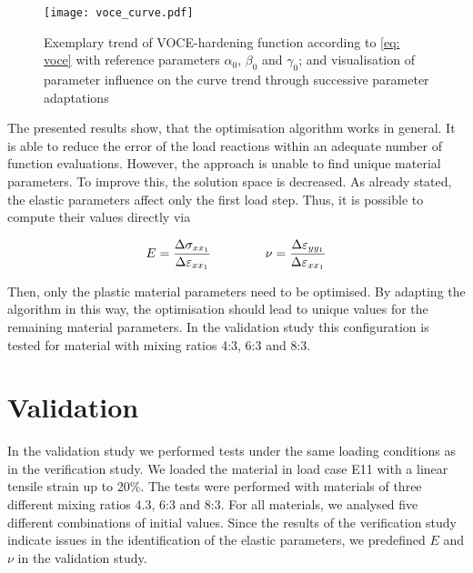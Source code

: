 \begin{figure}[H]
    \centering
    \texttt{[image: voce\_curve.pdf]}
    \caption{Exemplary trend of VOCE-hardening function according to \autoref{eq: voce} with reference parameters $\alpha_0$, $\beta_0$ and $\gamma_0$; and visualisation of parameter influence on the curve trend through successive parameter adaptations}
    \label{fig:voceCurve}
\end{figure}

The presented results show, that the optimisation algorithm works in general. It is able to reduce the error of the load reactions within an adequate number of function evaluations. However, the approach is unable to find unique material parameters. To improve this, the solution space is decreased. As already stated, the elastic parameters affect only the first load step. Thus, it is possible to compute their values directly via

\begin{gather}\label{eq: EandNu}
    E = \frac{\Delta\sigma_{xx_1}}{\Delta\varepsilon_{xx_1}} \hspace{1.5cm}
    \nu = \frac{\Delta\varepsilon_{yy_1}}{\Delta\varepsilon_{xx_1}}
\end{gather}
    
Then, only the plastic material parameters need to be optimised. By adapting the algorithm in this way, the optimisation should lead to unique values for the remaining material parameters. In the validation study this configuration is tested for material with mixing ratios 4:3, 6:3 and 8:3. \\


\newpage
\section{Validation}\label{sec: validation}
In the validation study we performed tests under the same loading conditions as in the verification study.
We loaded the material in load case E11 with a linear tensile strain up to 20\%.
The tests were performed with materials of three different mixing ratios 4.3, 6:3 and 8:3. 
For all materials, we analysed five different combinations of initial values.
Since the results of the verification study indicate issues in the identification of the elastic parameters, we predefined $E$ and $\nu$ in the validation study. 

